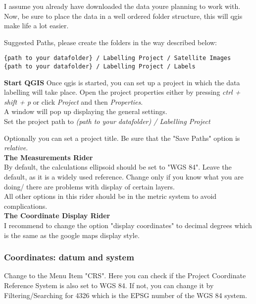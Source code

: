 \documentclass[12pt,a4paper]{scrartcl}
\begin{document}
I assume you already have downloaded the data youre planning to work with.
Now, be sure to place the data in a well ordered folder structure, this will qgis
make life a lot easier. \newline

Suggested Paths, please create the folders in the way described below:

\begin{verbatim}
{path to your datafolder} / Labelling Project / Satellite Images
{path to your datafolder} / Labelling Project / Labels
\end{verbatim}


{\large \textbf{Start QGIS}} \newline
Once qgis is started, you can set up a project in which the data labelling will take place. 
Open the project properties either by pressing \textit{ctrl + shift + p} or click \textit{Project} and then \textit{Properties}.\\

A window will pop up displaying the general settings. \\
Set the project path to \textit{ (path to your datafolder) / Labelling Project}

Optionally you can set a project title.
Be sure that the "Save Paths" option is \textit{relative}.\\

\textbf{The Measurements Rider}  \\
By default, the calculations ellipsoid should be set to "WGS 84". 
Leave the default, as it is a widely used reference.
Change only if you know what you are doing/ there are problems with display of certain layers. \\
All other options in this rider should be in the metric system to avoid complications.\\

\textbf{The Coordinate Display Rider} \\
I recommend to change the option "display coordinates" to decimal degrees which is the same as the google maps 
display style.

\subsubsection{Coordinates: datum and system}

Change to the Menu Item "CRS".
Here you can check if the Project Coordinate Reference System is also set to WGS 84. 
If not, you can change it by Filtering/Searching for 4326 which is the EPSG number of the WGS 84 system.  \\
\end{document}
